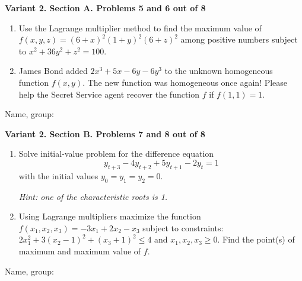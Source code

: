 \documentclass[12pt,a4paper]{article}
\begin{document}
\newpage
\textbf{Variant 2. Section A. Problems 5 and 6 out of 8}

\begin{enumerate}[resume]

\item Use the Lagrange multiplier method to find the maximum value of $f(x,y,z)=(6+x)^2(1+y)^2(6+z)^2$ among positive numbers subject to $x^2 + 36y^2 + z^2 = 100$.

\item James Bond added $2x^3+5x-6y - 6y^3$ to the unknown homogeneous function $f(x, y)$. The new function was homogeneous once again! Please help the Secret Service agent recover the function $f$ if $f(1, 1)=1$.

\end{enumerate}


\begin{framed}
\begin{minipage}{42em}
Name, group:\vspace*{3ex}\par
\noindent\dotfill
\end{minipage}
\end{framed}

\newpage
\textbf{Variant 2. Section B. Problems 7 and 8 out of 8}

\begin{enumerate}[resume]

\item Solve initial-value problem for the difference equation
\[
y_{t+3} -4y_{t+2} +5y_{t+1} -2y_{t} =1
\]
with the initial values $y_{0} =y_{1} =y_{2} =0$.

\textit{Hint: one of the characteristic roots is 1.}

\item Using Lagrange multipliers maximize the function $f(x_1,x_2,x_3)=-3x_1+2x_2-x_3$ subject to constraints:   $2x_1^2+3(x_2-1)^2+(x_3+1)^2\leq 4$ and $x_1, x_2, x_3 \geq 0$. Find the point(s) of maximum and maximum value of $f$.

\end{enumerate}


\begin{framed}
\begin{minipage}{42em}
Name, group:\vspace*{3ex}\par
\noindent\dotfill
\end{minipage}
\end{framed}

\end{document}
